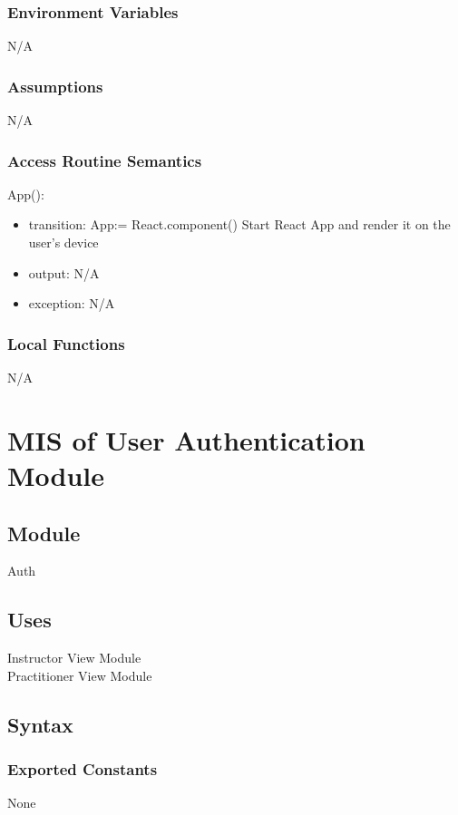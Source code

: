 \documentclass[12pt, titlepage]{article}
\begin{document}
\subsubsection{Environment Variables}
N/A

\subsubsection{Assumptions}
N/A

\subsubsection{Access Routine Semantics}

\noindent App():
\begin{itemize}
  \item transition: App:= React.component() Start React App and render it on the user's device
  \item output: N/A
  \item exception: N/A
\end{itemize}

\subsubsection{Local Functions}
N/A

\section{MIS of User Authentication Module}
\label{sec:userauth}

\subsection{Module}
Auth

\subsection{Uses}
Instructor View Module\\
Practitioner View Module

\subsection{Syntax}

\subsubsection{Exported Constants}
None
\end{document}
